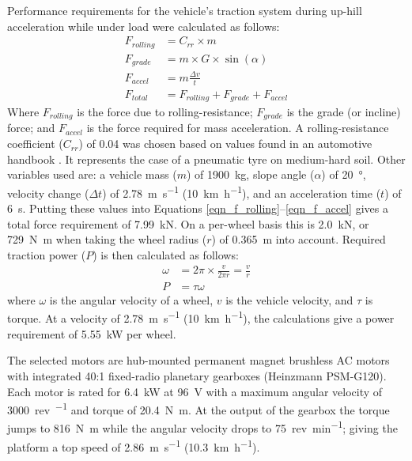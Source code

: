 \documentclass[preprint,authoryear,12pt]{elsarticle}
\begin{document}

        Performance requirements for the vehicle's traction system during up-hill acceleration while under load were calculated as follows:
        \begin{align}
        \label{eqn_f_rolling}
        F_{rolling} &= C_{rr} \times m\\
        F_{grade} &= m \times G \times \sin(\alpha)\\
        F_{accel} &= m \frac{\Delta v}{t}\\
        \label{eqn_f_accel}
        F_{total} &= F_{rolling} + F_{grade} + F_{accel}
        \end{align}
        Where $F_{rolling}$ is the force due to rolling-resistance; $F_{grade}$ is the grade (or incline) force; and $F_{accel}$ is the force required for mass acceleration.
        A rolling-resistance coefficient ($C_{rr}$) of 0.04 was chosen based on values found in an automotive handbook \citep{RobertBoschGmbH2002}.
        It represents the case of a pneumatic tyre on medium-hard soil.
        Other variables used are: a vehicle mass ($m$) of \SI{1900}{\kilo\gram}, slope angle ($\alpha$) of \SI{20}{\degree}, velocity change ($\Delta t$) of \SI{2.78}{\metre\per\second} (\SI{10}{\kilo\meter\per\hour}), and an acceleration time ($t$) of \SI{6}{\second}.
        Putting these values into Equations \ref{eqn_f_rolling}--\ref{eqn_f_accel} gives a total force requirement of \SI{7.99}{\kilo\newton}.
        On a per-wheel basis this is \SI{2.0}{\kilo\newton}, or \SI{729}{\newton\meter} when taking the wheel radius ($r$) of \SI{0.365}{\meter} into account.
        Required traction power ($P$) is then calculated as follows:
        \begin{align}
        \label{eqn_f_power}
        \omega &= 2 \pi \times \frac{v}{2 \pi r} = \frac{v}{r}\\
        P &= \tau \omega
        \end{align}
        where $\omega$ is the angular velocity of a wheel, $v$ is the vehicle velocity, and $\tau$ is torque.
        At a velocity of \SI{2.78}{\meter\per\second} (\SI{10}{\kilo\meter\per\hour}), the calculations give a power requirement of \SI{5.55}{\kilo\watt} per wheel.

        The selected motors are hub-mounted permanent magnet brushless AC motors with integrated 40:1 fixed-radio planetary gearboxes (Heinzmann PSM-G120).
        Each motor is rated for \SI{6.4}{\kilo\watt} at \SI{96}{\volt} with a maximum angular velocity of \SI{3000}{rev\per\min} and torque of \SI{20.4}{\newton\meter}.
        At the output of the gearbox the torque jumps to \SI{816}{\newton\meter} while the angular velocity drops to \SI{75}{rev\per\minute}; giving the platform a top speed of \SI{2.86}{\meter\per\second} (\SI{10.3}{\kilo\meter\per\hour}).
\end{document}
